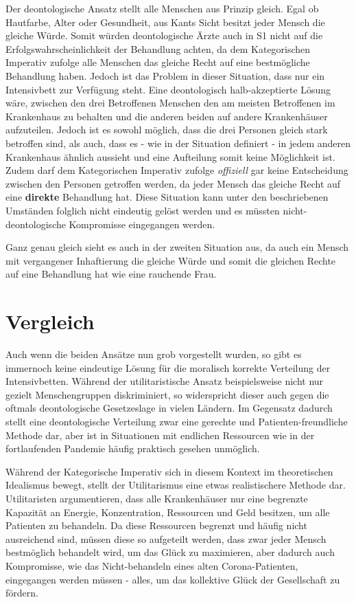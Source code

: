 \documentclass[a4paper]{article}
\begin{document}
Der deontologische Ansatz stellt alle Menschen aus Prinzip gleich. Egal ob Hautfarbe, Alter oder Gesundheit, aus Kants Sicht besitzt jeder Mensch die gleiche Würde. Somit würden deontologische Ärzte auch in S1 nicht auf die Erfolgswahrscheinlichkeit der Behandlung achten, da dem Kategorischen Imperativ zufolge alle Menschen das gleiche Recht auf eine bestmögliche Behandlung haben. Jedoch ist das Problem in dieser Situation, dass nur ein Intensivbett zur Verfügung steht. Eine deontologisch halb-akzeptierte Lösung wäre, zwischen den drei Betroffenen Menschen den am meisten Betroffenen im Krankenhaus zu behalten und die anderen beiden auf andere Krankenhäuser aufzuteilen. Jedoch ist es sowohl möglich, dass die drei Personen gleich stark betroffen sind, als auch, dass es - wie in der Situation definiert - in jedem anderen Krankenhaus ähnlich aussieht und eine Aufteilung somit keine Möglichkeit ist. Zudem darf dem Kategorischen Imperativ zufolge \textit{offiziell} gar keine Entscheidung zwischen den Personen getroffen werden, da jeder Mensch das gleiche Recht auf eine \textbf{direkte} Behandlung hat. Diese Situation kann unter den beschriebenen Umständen folglich nicht eindeutig gelöst werden und es müssten nicht-deontologische Kompromisse eingegangen werden.

Ganz genau gleich sieht es auch in der zweiten Situation aus, da auch ein Mensch mit vergangener Inhaftierung die gleiche Würde und somit die gleichen Rechte auf eine Behandlung hat wie eine rauchende Frau.

\section{Vergleich}

Auch wenn die beiden Ansätze nun grob vorgestellt wurden, so gibt es immernoch keine eindeutige Lösung für die moralisch korrekte Verteilung der Intensivbetten. Während der utilitaristische Ansatz beispielsweise nicht nur gezielt Menschengruppen diskriminiert, so widerspricht dieser auch gegen die oftmals deontologische Gesetzeslage in vielen Ländern. Im Gegensatz dadurch stellt eine deontologische Verteilung zwar eine gerechte und Patienten-freundliche Methode dar, aber ist in Situationen mit endlichen Ressourcen wie in der fortlaufenden Pandemie häufig praktisch gesehen unmöglich.

Während der Kategorische Imperativ sich in diesem Kontext im theoretischen Idealismus bewegt, stellt der Utilitarismus eine etwas realistischere Methode dar. Utilitaristen argumentieren, dass alle Krankenhäuser nur eine begrenzte Kapazität an Energie, Konzentration, Ressourcen und Geld besitzen, um alle Patienten zu behandeln. Da diese Ressourcen begrenzt und häufig nicht ausreichend sind, müssen diese so aufgeteilt werden, dass zwar jeder Mensch bestmöglich behandelt wird, um das Glück zu maximieren, aber dadurch auch Kompromisse, wie das Nicht-behandeln eines alten Corona-Patienten, eingegangen werden müssen - alles, um das kollektive Glück der Gesellschaft zu fördern.
\end{document}
